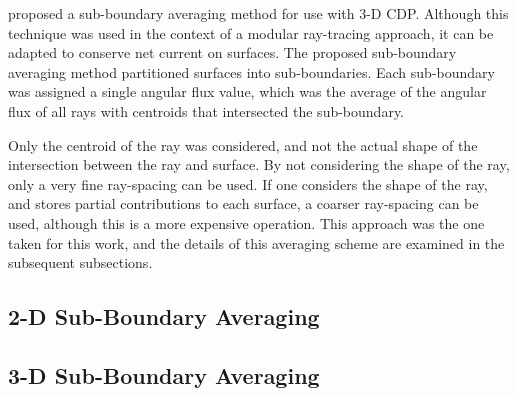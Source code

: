 {{      \citet{Liu2014} proposed a sub-boundary averaging method for use with 3-D \ac{CDP}.
      Although this technique was used in the context of a modular ray-tracing approach, it can be adapted to conserve net current on surfaces.
      The proposed sub-boundary averaging method partitioned surfaces into sub-boundaries.
      Each sub-boundary was assigned a single angular flux value, which was the average of the angular flux of all rays with centroids that intersected the sub-boundary.

      Only the centroid of the ray was considered, and not the actual shape of the intersection between the ray and surface.
      By not considering the shape of the ray, only a very fine ray-spacing can be used.
      If one considers the shape of the ray, and stores partial contributions to each surface, a coarser ray-spacing can be used, although this is a more expensive operation.
      This approach was the one taken for this work, and the details of this averaging scheme are examined in the subsequent subsections.

      \subsection{2-D Sub-Boundary Averaging}{\label{ssec:RT:2-D Sub-Boundary Averaging}
        \blindtext[4]
      }
      \subsection{3-D Sub-Boundary Averaging}{\label{ssec:3-D Sub-Boundary Averaging}
        \blindtext[8]
      }
    }
}